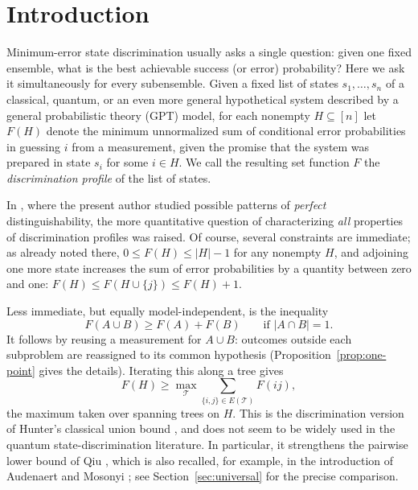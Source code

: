 \documentclass[a4paper,11pt,onecolumn,unpublished]{quantumarticle}
\theoremstyle{definition}
\newcommand{\1}{\mathbf 1}
\begin{document}
\section{Introduction}\label{sec:intro}

Minimum-error state discrimination usually asks a single question: given one
fixed ensemble, what is the best achievable success (or error) probability?
Here we ask it simultaneously for every subensemble. Given a fixed list of
states $s_1,\ldots,s_n$ of a classical, quantum, or an even more general
hypothetical system described by a general probabilistic theory (GPT) model,
for each nonempty $H\subseteq[n]$ let $F(H)$ denote the minimum unnormalized sum
of conditional error probabilities in guessing $i$ from a measurement, given
the promise that the system was prepared in state $s_i$ for some $i\in H$. We
call the resulting set function $F$ the \emph{discrimination profile} of the
list of states.

In \cite{Weiner2025}, where the present author studied possible patterns of
\emph{perfect} distinguishability, the more quantitative question of
characterizing \emph{all} properties of discrimination profiles was raised. Of
course, several constraints are immediate; as already noted there,
$0\le F(H)\le |H|-1$ for any nonempty $H$, and adjoining one more state
increases the sum of error probabilities by a quantity between zero and one:
$F(H)\le F(H\cup\{j\})\le F(H)+1$.

Less immediate, but equally model-independent, is the inequality
\begin{equation}\label{eq:intro-gluing}
 F(A\cup B)\ge F(A)+F(B)\qquad\text{if }|A\cap B|=1.
\end{equation}
It follows by reusing a measurement for $A\cup B$: outcomes outside each
subproblem are reassigned to its common hypothesis
(Proposition~\ref{prop:one-point} gives the details). Iterating this along a
tree gives
\begin{equation}\label{eq:intro-tree}
 F(H)\ge\max_{\mathcal T}\sum_{\{i,j\}\in E(\mathcal T)}F(ij),
\end{equation}
the maximum taken over spanning trees on $H$. This is the discrimination version of Hunter's classical union bound \cite{Hunter1976}, and does not seem to be widely used in the quantum state-discrimination literature. In particular, it strengthens the pairwise lower bound of Qiu \cite{Qiu2008}, which is also recalled, for example, in the introduction of Audenaert and Mosonyi \cite{AudenaertMosonyi2014}; see Section~\ref{sec:universal} for the precise comparison.
\end{document}
